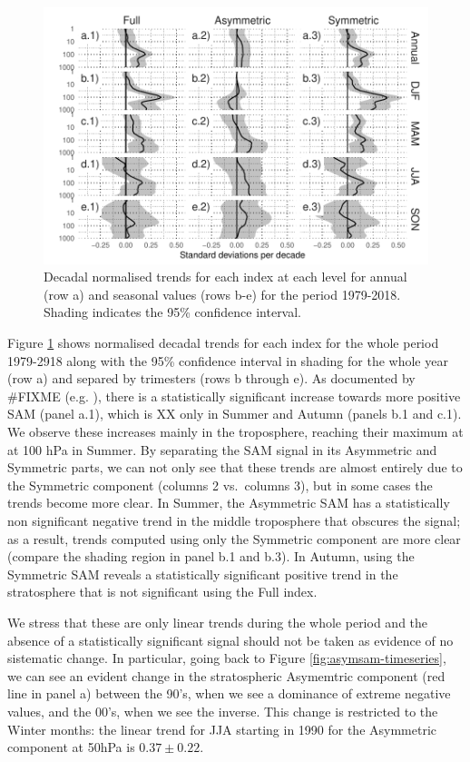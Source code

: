 \documentclass[twocol]{ametsocV5}
\begin{document}
\begin{figure}
\includegraphics{trends-1} \caption[Decadal normalised trends for each index at each level for annual (row a) and seasonal values (rows b-e) for the period 1979-2018]{Decadal normalised trends for each index at each level for annual (row a) and seasonal values (rows b-e) for the period 1979-2018. Shading indicates the 95\% confidence interval.}\label{fig:trends}
\end{figure}

Figure \ref{fig:trends} shows normalised decadal trends for each index
for the whole period 1979-2918 along with the 95\% confidence interval
in shading for the whole year (row a) and separed by trimesters (rows b
through e). As documented by \#FIXME (e.g. \citet{fogt2020}), there is a
statistically significant increase towards more positive SAM (panel
a.1), which is XX only in Summer and Autumn (panels b.1 and c.1). We
observe these increases mainly in the troposphere, reaching their
maximum at at 100 hPa in Summer. By separating the SAM signal in its
Asymmetric and Symmetric parts, we can not only see that these trends
are almost entirely due to the Symmetric component (columns 2
vs.~columns 3), but in some cases the trends become more clear. In
Summer, the Asymmetric SAM has a statistically non significant negative
trend in the middle troposphere that obscures the signal; as a result,
trends computed using only the Symmetric component are more clear
(compare the shading region in panel b.1 and b.3). In Autumn, using the
Symmetric SAM reveals a statistically significant positive trend in the
stratosphere that is not significant using the Full index.

We stress that these are only linear trends during the whole period and
the absence of a statistically significant signal should not be taken as
evidence of no sistematic change. In particular, going back to Figure
\ref{fig:asymsam-timeseries}, we can see an evident change in the
stratospheric Asymemtric component (red line in panel a) between the
90's, when we see a dominance of extreme negative values, and the 00's,
when we see the inverse. This change is restricted to the Winter months:
the linear trend for JJA starting in 1990 for the Asymmetric component
at 50hPa is \(0.37 \pm 0.22\).
\end{document}
